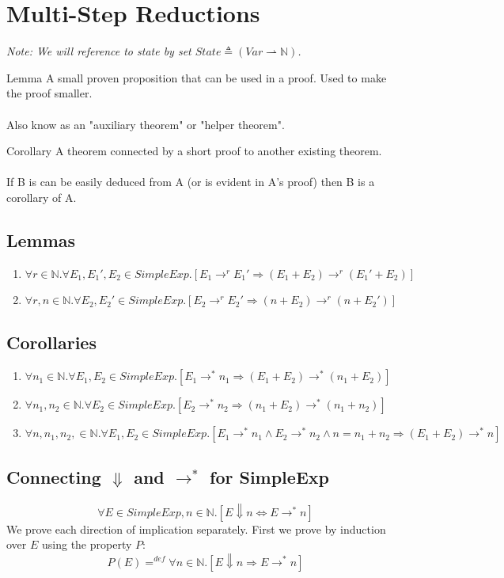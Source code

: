 \section{Multi-Step Reductions}
\textit{Note: We will reference to state by set $State \triangleq (Var \rightharpoonup \mathbb{N})$.}

\begin{definitionbox}{Lemma}
	A small proven proposition that can be used in a proof. Used to make the proof smaller.
	\\
	\\ Also know as an "auxiliary theorem" or "helper theorem".
\end{definitionbox}
\begin{definitionbox}{Corollary}
	A theorem connected by a short proof to another existing theorem.
	\\
	\\ If B is can be easily deduced from A (or is evident in A's proof) then B is a corollary of A.
\end{definitionbox}
\subsection{Lemmas}
\begin{enumerate}
	\item $\forall r \in \mathbb{N}. \forall E_1,E_1',E_2 \in SimpleExp. [E_1 \to^r E_1' \Rightarrow (E_1 + E_2) \to^r (E_1' + E_2)]$
	\item $\forall r,n \in \mathbb{N}. \forall E_2,E_2' \in SimpleExp . [E_2 \to^r E_2' \Rightarrow (n + E_2) \to^r (n + E_2')]$
\end{enumerate}
\subsection{Corollaries}
\begin{enumerate}
	\item $\forall n_1 \in \mathbb{N} . \forall E_1, E_2 \in SimpleExp . [E_1 \to^* n_1 \Rightarrow (E_1 + E_2) \to^* (n_1 + E_2)]$
	\item $\forall n_1, n_2 \in \mathbb{N} . \forall E_2 \in SimpleExp . [E_2 \to^* n_2 \Rightarrow (n_1 + E_2) \to^* (n_1 + n_2)]$
	\item $\forall n,n_1, n_2, \in \mathbb{N} . \forall E_1, E_2 \in SimpleExp . [E_1 \to^* n_1 \land E_2 \to^* n_2 \land n = n_1 + n_2 \Rightarrow (E_1 + E_2) \to^* n]$
\end{enumerate}

\subsection{Connecting $\Downarrow$ and $\to^*$ for SimpleExp}
\[\forall E \in SimpleExp, n \in \mathbb{N}.[E \Downarrow n \Leftrightarrow E \to^* n]\]
We prove each direction of implication separately. First we prove by induction over $E$ using the property $P$:
\[P(E) =^{def} \forall n \in \mathbb{N}.[E \Downarrow n \Rightarrow E \to^* n]\]
